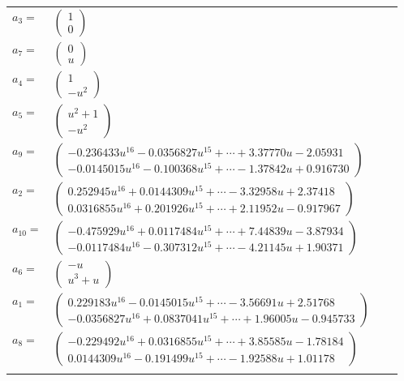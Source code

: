 \documentclass[1p]{elsarticle_modified}
\theoremstyle{definition}
\begin{document}
\begin{tabular}{m{7pt} m{180pt} m{7pt} m{180pt} }
\flushright $a_{3}=$&$\begin{pmatrix}1\\0\end{pmatrix}$ \\
\flushright $a_{7}=$&$\begin{pmatrix}0\\u\end{pmatrix}$ \\
\flushright $a_{4}=$&$\begin{pmatrix}1\\- u^2\end{pmatrix}$ \\
\flushright $a_{5}=$&$\begin{pmatrix}u^2+1\\- u^2\end{pmatrix}$ \\
\flushright $a_{9}=$&$\begin{pmatrix}-0.236433 u^{16}-0.0356827 u^{15}+\cdots+3.37770 u-2.05931\\-0.0145015 u^{16}-0.100368 u^{15}+\cdots-1.37842 u+0.916730\end{pmatrix}$ \\
\flushright $a_{2}=$&$\begin{pmatrix}0.252945 u^{16}+0.0144309 u^{15}+\cdots-3.32958 u+2.37418\\0.0316855 u^{16}+0.201926 u^{15}+\cdots+2.11952 u-0.917967\end{pmatrix}$ \\
\flushright $a_{10}=$&$\begin{pmatrix}-0.475929 u^{16}+0.0117484 u^{15}+\cdots+7.44839 u-3.87934\\-0.0117484 u^{16}-0.307312 u^{15}+\cdots-4.21145 u+1.90371\end{pmatrix}$ \\
\flushright $a_{6}=$&$\begin{pmatrix}- u\\u^3+u\end{pmatrix}$ \\
\flushright $a_{1}=$&$\begin{pmatrix}0.229183 u^{16}-0.0145015 u^{15}+\cdots-3.56691 u+2.51768\\-0.0356827 u^{16}+0.0837041 u^{15}+\cdots+1.96005 u-0.945733\end{pmatrix}$ \\
\flushright $a_{8}=$&$\begin{pmatrix}-0.229492 u^{16}+0.0316855 u^{15}+\cdots+3.85585 u-1.78184\\0.0144309 u^{16}-0.191499 u^{15}+\cdots-1.92588 u+1.01178\end{pmatrix}$\\&\end{tabular}
\end{document}
